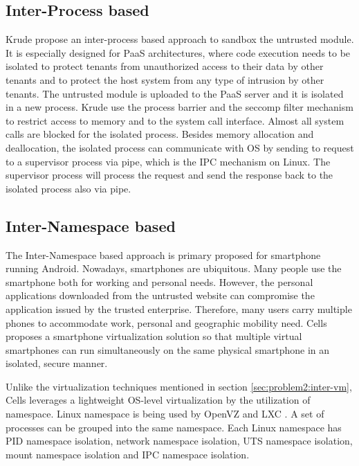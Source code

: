\subsection{Inter-Process based}
\label{sec:problem2:inter-process}

Krude \etal \cite{Krude} propose an inter-process based approach to sandbox the
untrusted module. It is especially designed for PaaS architectures, where
code execution needs to be isolated to protect tenants from unauthorized access
to their data by other tenants and to protect the host system from any type of
intrusion by other tenants. The untrusted module is uploaded to the PaaS server
and it is isolated in a new process. Krude \etal use the process barrier and
the seccomp filter mechanism to restrict access to memory and to the system
call interface. Almost all system calls are blocked for the isolated process.
Besides memory allocation and deallocation, the isolated process can communicate with OS
by sending to request to a supervisor process via pipe, which is the IPC
mechanism on Linux. The supervisor process will process the request and send
the response back to the isolated process also via pipe.

\subsection{Inter-Namespace based}
\label{sec:problem2:inter-namespace}

The Inter-Namespace based approach is primary proposed for smartphone running
Android. Nowadays, smartphones are ubiquitous. Many people use the smartphone both for
working and personal needs. However, the personal applications downloaded from
the untrusted website can compromise the application issued by the trusted
enterprise. Therefore, many users carry multiple phones to accommodate work,
personal and geographic mobility need. Cells \cite{Cells} proposes a smartphone
virtualization solution so that multiple virtual smartphones can run
simultaneously on the same physical smartphone in an isolated, secure manner.

Unlike the virtualization techniques mentioned in section
\ref{sec:problem2:inter-vm}, Cells leverages a lightweight OS-level
virtualization by the utilization of namespace. Linux namespace is being used
by OpenVZ \cite{openvz} and LXC \cite{lxc}. A set of processes can be grouped
into the same namespace. Each Linux namespace has PID namespace isolation,
network namespace isolation, UTS namespace isolation, mount namespace isolation
and IPC namespace isolation.

